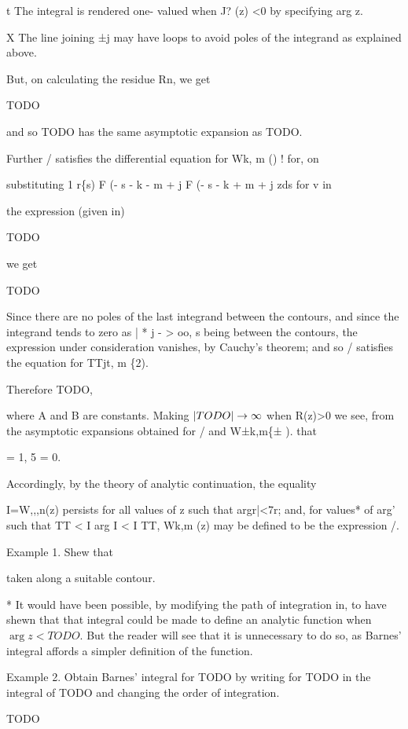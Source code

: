 t The integral is rendered one- valued when J? (z) <0 by specifying
arg z.

X The line joining ±j may have loops to avoid poles of the integrand
as explained above.

%
%
But, on calculating the residue Rn, we get

TODO

and so TODO has the same asymptotic expansion as TODO.

Further / satisfies the differential equation for Wk, m () ! for, on

substituting 1 r\{s) F (- s - k - m + j F (- s - k + m + j zds
for v in

the expression (given in)

TODO

we get

TODO

Since there are no poles of the last integrand between the contours,
and since the integrand tends to zero as | * j - > oo, s being
between the contours, the expression under consideration vanishes, by
Cauchy's theorem; and so / satisfies the equation for TTjt, m \{2).

Therefore TODO,

where A and B are constants. Making $\left| TODO \right| \rightarrow \infty$
when R(z)>0 we see, from the asymptotic expansions obtained for / and
W±k,m\{± ). that

 = 1, 5 = 0.

Accordingly, by the theory of analytic continuation, the equality

I=W,,,n(z) persists for all values of z such that argr|<7r; and, for
values* of arg' such that TT < I arg  I < I TT, Wk,m (z) may be
defined to be the expression /.

Example 1. Shew that

taken along a suitable contour.

* It would have been possible, by modifying the path of integration in, to have shewn that that integral could be made to define an
analytic function when $\arg z < TODO$. But the reader will see that
it is unnecessary to do so, as Barnes' integral affords a simpler
definition of the function.

%
%

Example 2. Obtain Barnes' integral for TODO by writing for TODO in the
integral of TODO and changing the order of integration.

TODO

